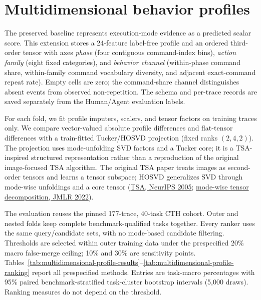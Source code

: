 \section{Multidimensional behavior profiles}
\label{sec:multidimensional-profiles}

The preserved baseline represents execution-mode evidence as a predicted scalar score. This extension stores a 24-feature label-free profile and an ordered third-order tensor with axes \emph{phase} (four contiguous command-index bins), \emph{action family} (eight fixed categories), and \emph{behavior channel} (within-phase command share, within-family command vocabulary diversity, and adjacent exact-command repeat rate). Empty cells are zero; the command-share channel distinguishes absent events from observed non-repetition. The schema and per-trace records are saved separately from the Human/Agent evaluation labels.

For each fold, we fit profile imputers, scalers, and tensor factors on training traces only. We compare vector-valued absolute profile differences and flat-tensor differences with a train-fitted Tucker/HOSVD projection (fixed ranks $(2,4,2)$). The projection uses mode-unfolding SVD factors and a Tucker core; it is a TSA-inspired structured representation rather than a reproduction of the original image-focused TSA algorithm. The original TSA paper treats images as second-order tensors and learns a tensor subspace; HOSVD generalizes SVD through mode-wise unfoldings and a core tensor (\href{https://papers.nips.cc/paper_files/paper/2005/hash/332647f433a1c10fa2e2ae04abfdf83e-Abstract.html}{TSA, NeurIPS 2005}; \href{https://jmlr.csail.mit.edu/papers/volume22/21-0287/21-0287.pdf}{mode-wise tensor decomposition, JMLR 2022}).

The evaluation reuses the pinned 177-trace, 40-task CTH cohort. Outer and nested folds keep complete benchmark-qualified tasks together. Every ranker uses the same query/candidate sets, with no mode-based candidate filtering. Thresholds are selected within outer training data under the prespecified 20\% macro false-merge ceiling; 10\% and 30\% are sensitivity points. Tables~\ref{tab:multidimensional-profile-results}--\ref{tab:multidimensional-profile-ranking} report all prespecified methods. Entries are task-macro percentages with 95\% paired benchmark-stratified task-cluster bootstrap intervals (5,000 draws). Ranking measures do not depend on the threshold.

